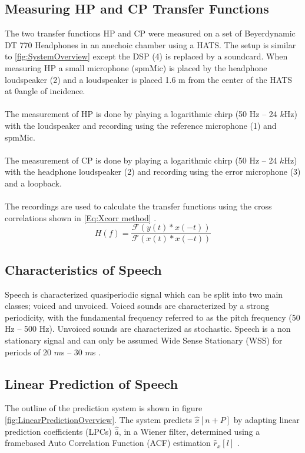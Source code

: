\subsection{Measuring HP and CP Transfer Functions}
The two transfer functions HP and CP were measured on a set of Beyerdynamic DT 770 Headphones in an anechoic chamber using a HATS. The setup is similar to \autoref{fig:SystemOverview} except the DSP (4) is replaced by a soundcard. When measuring HP a small microphone (spmMic) is placed by the headphone loudspeaker (2) and a loudspeaker is placed 1.6 m from the center of the HATS at 0\textdegree angle of incidence.     
\\\\
The measurement of HP is done by playing a logarithmic chirp (50 Hz -- 24 $k$Hz) with the loudspeaker and recording using the reference microphone (1) and spmMic.  
\\\\
The measurement of CP is done by playing a logarithmic chirp (50 Hz -- 24 $k$Hz) with the headphone loudspeaker (2) and recording using the error microphone (3) and a loopback.
\\\\
The recordings are used to calculate the transfer functions using the cross correlations shown in \autoref{Eq:Xcorr method} \cite{TutorialMeasurementPowerSpectra}.   
\begin{equation}
H(f)=\dfrac{\mathscr{F}(y(t)\ast x(-t))} {\mathscr{F}(x(t)\ast x(-t))}
\label{Eq:Xcorr method}
\end{equation}



\subsection{Characteristics of Speech}
Speech is characterized quasiperiodic signal which can be split into two main classes; voiced and unvoiced. Voiced sounds are characterized by a strong periodicity, with the fundamental frequency referred to as the pitch frequency (50 Hz -- 500 Hz). Unvoiced sounds are characterized as stochastic. Speech is a non stationary signal and can only be assumed Wide Sense Stationary (WSS) for periods of 20 $m$s -- 30 $m$s \cite{Speech}. 

\subsection{Linear Prediction of Speech}
The outline of the prediction system is shown in figure \ref{fig:LinearPredictionOverview}. The system predicts $\hat{x}[n+P]$ by adapting linear prediction coefficients (LPCs) $\hat{\bar{a}}$, in a Wiener filter, determined using a framebased Auto Correlation Function (ACF) estimation $\hat{r}_x[l]$ \cite{LinearPrediction}.   

